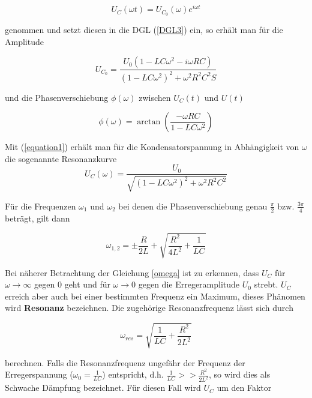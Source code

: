  \begin{equation*}
   U_C(\omega t) = U_{C_0} (\omega) e^{i \omega t}
 \end{equation*}

 genommen und setzt diesen in die DGL (\ref{DGL3}) ein, so erhält man für die Amplitude

 \begin{equation}
   \label{equation1}
   U_{C_0} = \frac{U_0 (1 - LC \omega^2 - i \omega RC)}{(1 - LC \omega^2)^2 + \omega^2 R^2 C^2 S}
 \end{equation}

 und die Phasenverschiebung $\phi (\omega)$ zwischen $U_C(t)$ und $U(t)$

 \begin{equation}
 \label{winkel}
   \phi(\omega) = \arctan \left(\frac{- \omega RC}{1 - LC \omega^2}\right)
 \end{equation}

Mit (\ref{equation1}) erhält man für die Kondensatorspannung in Abhängigkeit von $\omega$ die sogenannte Resonanzkurve
\begin{equation}
  \label{omega}
  U_C(\omega) = \frac{U_0}{\sqrt{(1-LC \omega^2)^2 + \omega^2 R^2 C^2}}
\end{equation}

Für die Frequenzen $\omega_1$ und $\omega_2$ bei denen die Phasenverschiebung genau $\frac{\pi}{2}$ bzw. $\frac{3 \pi}{4}$
beträgt, gilt dann

\begin{equation}
  \omega_{1,2} = \pm \frac{R}{2L} + \sqrt{\frac{R^2}{4L^2} + \frac{1}{LC}}
\end{equation}

Bei näherer Betrachtung der Gleichung \eqref{omega} ist zu erkennen, dass $U_C$ für $\omega \to \infty$ gegen 0 geht
und für $\omega \to 0$ gegen die Erregeramplitude $U_0$ strebt. $U_C$ erreich aber auch bei einer bestimmten Frequenz
ein Maximum, dieses Phänomen wird \textbf{Resonanz} bezeichnen. Die zugehörige Resonanzfrequenz lässt sich durch

\begin{equation}
  \omega_{res} = \sqrt{\frac{1}{LC} + \frac{R^2}{2L^2}}
\end{equation}

berechnen. Falls die Resonanzfrequenz ungefähr der Frequenz der Erregerspannung ($\omega_0 = \frac{1}{LC}$) entspricht, d.h.
$ \frac{1}{LC} >> \frac{R^2}{2L^2} $, so wird dies als Schwache Dämpfung bezeichnet. Für diesen Fall wird $U_C$ um
den Faktor

